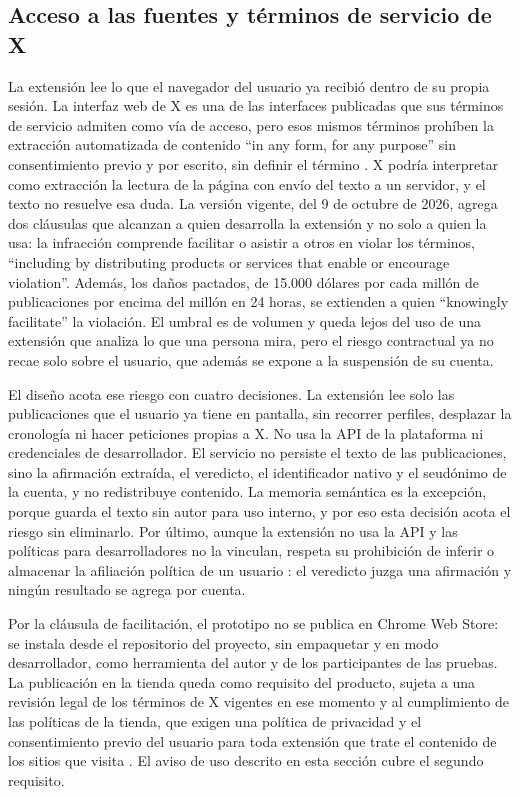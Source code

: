 \subsection{Acceso a las fuentes y términos de servicio de X}

La extensión lee lo que el navegador del usuario ya recibió dentro de su propia sesión. La interfaz web de X es una de las interfaces publicadas que sus términos de servicio admiten como vía de acceso, pero esos mismos términos prohíben la extracción automatizada de contenido \enquote{in any form, for any purpose} sin consentimiento previo y por escrito, sin definir el término \parencite{XCorp2026}. X podría interpretar como extracción la lectura de la página con envío del texto a un servidor, y el texto no resuelve esa duda. La versión vigente, del 9 de octubre de 2026, agrega dos cláusulas que alcanzan a quien desarrolla la extensión y no solo a quien la usa: la infracción comprende facilitar o asistir a otros en violar los términos, \enquote{including by distributing products or services that enable or encourage violation}. Además, los daños pactados, de 15.000 dólares por cada millón de publicaciones por encima del millón en 24 horas, se extienden a quien \enquote{knowingly facilitate} la violación. El umbral es de volumen y queda lejos del uso de una extensión que analiza lo que una persona mira, pero el riesgo contractual ya no recae solo sobre el usuario, que además se expone a la suspensión de su cuenta.

El diseño acota ese riesgo con cuatro decisiones. La extensión lee solo las publicaciones que el usuario ya tiene en pantalla, sin recorrer perfiles, desplazar la cronología ni hacer peticiones propias a X. No usa la API de la plataforma ni credenciales de desarrollador. El servicio no persiste el texto de las publicaciones, sino la afirmación extraída, el veredicto, el identificador nativo y el seudónimo de la cuenta, y no redistribuye contenido. La memoria semántica es la excepción, porque guarda el texto sin autor para uso interno, y por eso esta decisión acota el riesgo sin eliminarlo. Por último, aunque la extensión no usa la API y las políticas para desarrolladores no la vinculan, respeta su prohibición de inferir o almacenar la afiliación política de un usuario \parencite{XCorpDesarrolladores2026}: el veredicto juzga una afirmación y ningún resultado se agrega por cuenta.

Por la cláusula de facilitación, el prototipo no se publica en Chrome Web Store: se instala desde el repositorio del proyecto, sin empaquetar y en modo desarrollador, como herramienta del autor y de los participantes de las pruebas. La publicación en la tienda queda como requisito del producto, sujeta a una revisión legal de los términos de X vigentes en ese momento y al cumplimiento de las políticas de la tienda, que exigen una política de privacidad y el consentimiento previo del usuario para toda extensión que trate el contenido de los sitios que visita \parencite{Google2026}. El aviso de uso descrito en esta sección cubre el segundo requisito.

